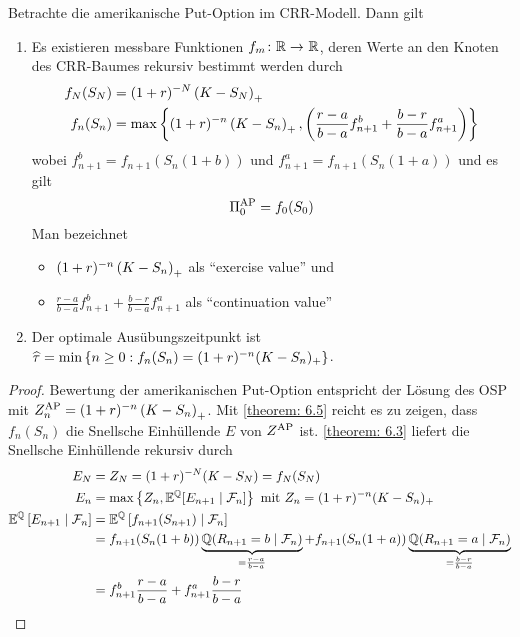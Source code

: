 \begin{theorem}
	Betrachte die amerikanische Put-Option im CRR-Modell. Dann gilt
	\begin{enumerate}[label=(\alph*)]
		\item Es existieren messbare Funktionen $\abb{f_m}{\R}{\R}$, deren Werte an den Knoten des CRR-Baumes rekursiv bestimmt werden durch
		\begin{equation*}
			\begin{aligned}
				f_N(S_N) &= (1+r)^{-N} \left( K - S_N \right)_+ \\
				f_n(S_n) &= \max\left\{ (1+r)^{-n} \left( K - S_n \right)_+ , \left( \frac{r-a}{b-a} f_{n+1}^b + \frac{b-r}{b-a} f_{n+1}^a  \right) \right\}
			\end{aligned}
		\end{equation*}
		wobei $f_{n+1}^b = f_{n+1}(S_n(1+b))$ und $f_{n+1}^a = f_{n+1}(S_n (1+a))$ und es gilt 
		\begin{equation*}
			\Pi_0^{\operatorname{AP}} = f_0(S_0)
		\end{equation*}
		Man bezeichnet
		\begin{itemize}
			\item $(1+r)^{-n} \left( K - S_n \right)_+ $ als \enquote{exercise value} und
			\item $\frac{r-a}{b-a} f_{n+1}^b + \frac{b-r}{b-a} f_{n+1}^a$ als \enquote{continuation value}
		\end{itemize}
	\item Der optimale Ausübungszeitpunkt ist $\widehat{\tau} = \min\left\{ n \ge 0 :  f_n(S_n) = (1+r)^{-n} (K - S_n)_+ \right\}$.
	\end{enumerate}
\end{theorem}
\begin{proof}
	Bewertung der amerikanischen Put-Option entspricht der Lösung des OSP mit $Z_n^{\operatorname{AP}} = (1+r)^{-n} \left( K - S_n \right)_+$. Mit \cref{theorem: 6.5} reicht es zu zeigen, dass $f_n(S_n)$ die Snellsche Einhüllende $E$ von $Z^{\operatorname{AP}}$ ist.
	\cref{theorem: 6.3} liefert die Snellsche Einhüllende rekursiv durch
	\begin{align*}
			E_N &= Z_N = (1+r)^{-N} (K-S_N) = f_N(S_N) \\
			E_n &= \max\left\{ Z_n , \mathbb{E}^{\mathbb{Q}}[E_{n+1} \mid \mathcal{F}_n] \right\} \text{ mit }  Z_n = (1+r)^{-n} (K-S_n)_+ \\
			\mathbb{E}^{\mathbb{Q}} \left[ E_{n+1} \mid \mathcal{F}_n \right] &= \mathbb{E}^{\mathbb{Q}} \left[ f_{n+1}(S_{n+1}) \mid \mathcal{F}_n \right] \\
			&= f_{n+1} (S_n (1+b)) \underbrace{\mathbb{Q}(R_{n+1} = b \mid \mathcal{F}_n)}_{= \frac{r-a}{b-a}} + f_{n+1}(S_n(1+a)) \underbrace{\mathbb{Q}(R_{n+1} = a \mid \mathcal{F}_n)}_{= \frac{b-r}{b-a}} \\
			&= f_{n+1}^b \frac{r-a}{b-a} + f_{n+1}^a \frac{b-r}{b-a}
	\end{align*}
\end{proof}